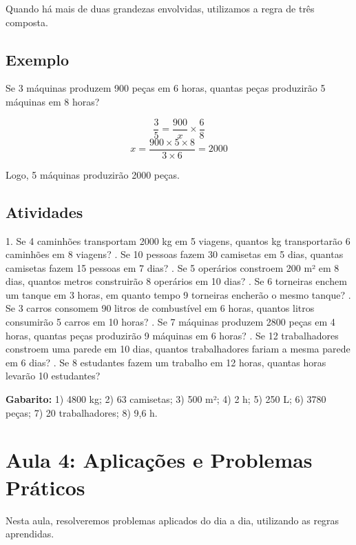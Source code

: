 \documentclass[a4paper,12pt]{article}
\begin{document}
Quando há mais de duas grandezas envolvidas, utilizamos a regra de três composta.

\subsection*{Exemplo}
Se 3 máquinas produzem 900 peças em 6 horas, quantas peças produzirão 5 máquinas em 8 horas?

\[ \frac{3}{5} = \frac{900}{x} \times \frac{6}{8} \]
\[ x = \frac{900 \times 5 \times 8}{3 \times 6} = 2000 \]

Logo, 5 máquinas produzirão 2000 peças.

\subsection*{Atividades}

1. Se 4 caminhões transportam 2000 kg em 5 viagens, quantos kg transportarão 6 caminhões em 8 viagens? . Se 10 pessoas fazem 30 camisetas em 5 dias, quantas camisetas fazem 15 pessoas em 7 dias? . Se 5 operários constroem 200 m² em 8 dias, quantos metros construirão 8 operários em 10 dias? . Se 6 torneiras enchem um tanque em 3 horas, em quanto tempo 9 torneiras encherão o mesmo tanque? . Se 3 carros consomem 90 litros de combustível em 6 horas, quantos litros consumirão 5 carros em 10 horas? . Se 7 máquinas produzem 2800 peças em 4 horas, quantas peças produzirão 9 máquinas em 6 horas? . Se 12 trabalhadores constroem uma parede em 10 dias, quantos trabalhadores fariam a mesma parede em 6 dias? . Se 8 estudantes fazem um trabalho em 12 horas, quantas horas levarão 10 estudantes? \newline

\textbf{Gabarito:} 1) 4800 kg; 2) 63 camisetas; 3) 500 m²; 4) 2 h; 5) 250 L; 6) 3780 peças; 7) 20 trabalhadores; 8) 9,6 h.

\section{Aula 4: Aplicações e Problemas Práticos}

Nesta aula, resolveremos problemas aplicados do dia a dia, utilizando as regras aprendidas.
\end{document}
